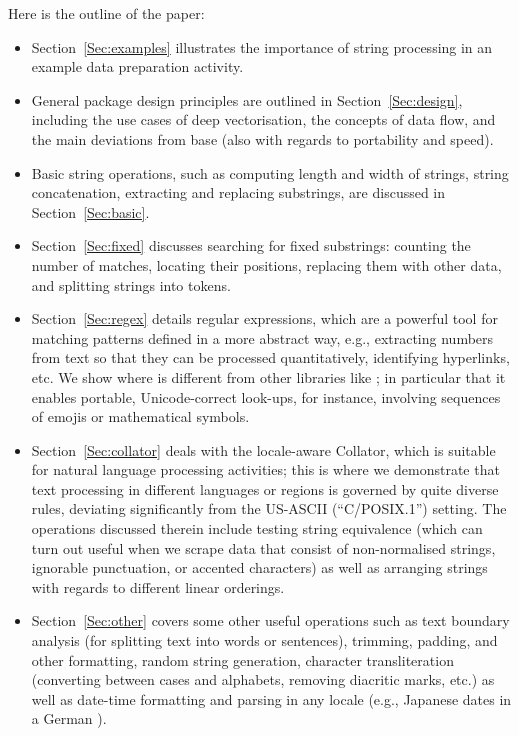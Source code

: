 \documentclass[nojss]{jss}\usepackage[]{graphicx}\usepackage[]{xcolor}
\begin{document}
Here is the outline of the paper:
\begin{itemize}
\item Section~\ref{Sec:examples} illustrates the importance of string
processing in an example data preparation activity.

\item General package design principles are outlined in
Section~\ref{Sec:design}, including the use cases of deep vectorisation,
the concepts of data flow,
and the main deviations from base 
(also with regards to portability and speed).

\item Basic string operations, such as computing length and width
of strings, string concatenation, extracting and replacing substrings,
are discussed in Section~\ref{Sec:basic}.

\item Section~\ref{Sec:fixed} discusses searching for fixed substrings:
counting the number of matches, locating their positions,
replacing them with other data, and splitting strings into tokens.

\item Section~\ref{Sec:regex} details  regular
expressions, which are a powerful tool for matching patterns defined in
a more abstract way, e.g., extracting numbers from text so that they can
be processed quantitatively, identifying hyperlinks, etc.
We show where  is different from other libraries like ;
in particular that it enables portable, Unicode-correct look-ups,
for instance, involving sequences of emojis or mathematical symbols.

\item Section~\ref{Sec:collator} deals with the locale-aware 
Collator, which is  suitable for natural language processing activities;
this is where we demonstrate that text processing in different languages
or regions is governed by quite diverse rules,
deviating significantly from the US-ASCII (``C/POSIX.1'') setting.
The operations discussed therein include testing string equivalence (which can
turn out useful when we scrape data that consist of non-normalised strings,
ignorable punctuation, or accented characters) as well as arranging strings
with regards to different linear orderings.

\item Section~\ref{Sec:other} covers some other useful operations such
as text boundary analysis (for splitting text into words or sentences),
trimming, padding, and other formatting, random string generation,
character transliteration (converting between cases and alphabets,
removing diacritic marks, etc.) as well as date-time formatting and
parsing in any locale (e.g., Japanese dates in a German ).


\end{itemize}
\end{document}
